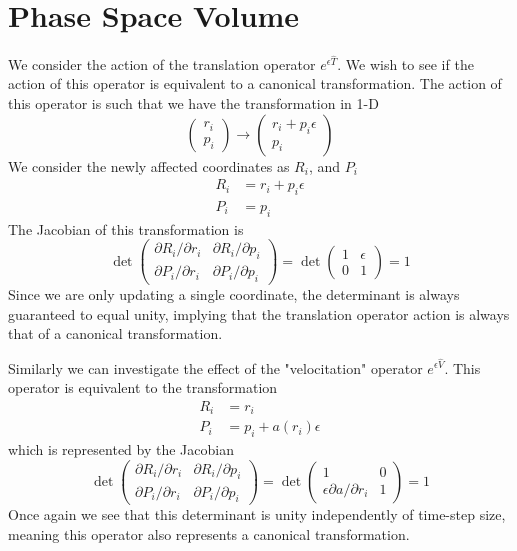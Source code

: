 \documentclass[8pt,a4paper]{article}
\begin{document}
	\section{Phase Space Volume}
	We consider the action of the translation operator $e^{\epsilon \hat{T}}$. We wish to see if the action of this operator is equivalent to a canonical transformation. The action of this operator is such that we have the transformation in 1-D
	\begin{equation}
		\begin{pmatrix}
			r_i \\
			p_i
		\end{pmatrix}
		\rightarrow
		\begin{pmatrix}
			r_i + p_i \epsilon \\
			p_i
		\end{pmatrix}
	\end{equation}
	We consider the newly affected coordinates as $R_i$, and $P_i$
	\begin{align}
		R_i &= r_i + p_i \epsilon \\
		P_i &= p_i
	\end{align}
	The Jacobian of this transformation is
	\begin{equation}
		\det
		\begin{pmatrix}
			\partial R_i/\partial r_i & \partial R_i/\partial p_i \\
			\partial P_i/\partial r_i & \partial P_i/\partial p_i
		\end{pmatrix}
		=\det
		\begin{pmatrix}
			1 & \epsilon \\
			0 & 1
		\end{pmatrix} = 1
	\end{equation}
	Since we are only updating a single coordinate, the determinant is always guaranteed to equal unity, implying that the translation operator action is always that of a canonical transformation.
	
	Similarly we can investigate the effect of the "velocitation" operator $e^{\epsilon\hat{V}}$. This operator is equivalent to the transformation
	\begin{align}
		R_i &= r_i \\
		P_i &= p_i + a(r_i) \epsilon
	\end{align}
	which is represented by the Jacobian
	\begin{equation}
		\det
		\begin{pmatrix}
			\partial R_i/\partial r_i & \partial R_i/\partial p_i \\
			\partial P_i/\partial r_i & \partial P_i/\partial p_i
		\end{pmatrix}
		=\det
		\begin{pmatrix}
			1 & 0 \\
			\epsilon\partial a/\partial r_i & 1
		\end{pmatrix} = 1
	\end{equation}
	Once again we see that this determinant is unity independently of time-step size, meaning this operator also represents a canonical transformation.
	
\end{document}
